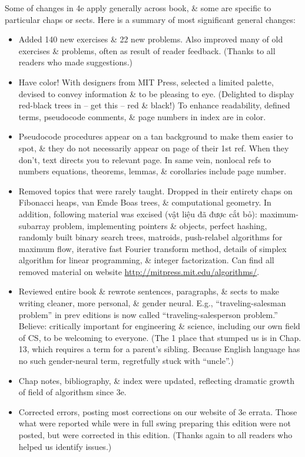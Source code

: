 \documentclass{article}
\begin{document}
\begin{itemize}
\begin{itemize}
		Some of changes in 4e apply generally across book, \& some are specific to particular chaps or sects. Here is a summary of most significant general changes:
		\begin{itemize}
			\item Added 140 new exercises \& 22 new problems. Also improved many of old exercises \& problems, often as result of reader feedback. (Thanks to all readers who made suggestions.)
			\item Have color! With designers from MIT Press, selected a limited palette, devised to convey information \& to be pleasing to eye. (Delighted to display red-black trees in -- get this -- red \& black!) To enhance readability, defined terms, pseudocode comments, \& page numbers in index are in color.
			\item Pseudocode procedures appear on a tan background to make them easier to spot, \& they do not necessarily appear on page of their 1st ref. When they don't, text directs you to relevant page. In same vein, nonlocal refs to numbers equations, theorems, lemmas, \& corollaries include page number.
			\item Removed topics that were rarely taught. Dropped in their entirety chaps on Fibonacci heaps, van Emde Boas trees, \& computational geometry. In addition, following material was excised (vật liệu đã được cắt bỏ): maximum-subarray problem, implementing pointers \& objects, perfect hashing, randomly built binary search trees, matroids, push-relabel algorithms for maximum flow, iterative fast Fourier transform method, details of simplex algorithm for linear programming, \& integer factorization. Can find all removed material on website \url{http://mitpress.mit.edu/algorithms/}.
			\item Reviewed entire book \& rewrote sentences, paragraphs, \& sects to make writing cleaner, more personal, \& gender neural. E.g., ``traveling-salesman problem'' in prev editions is now called ``traveling-salesperson problem.'' Believe: critically important for engineering \& science, including our own field of CS, to be welcoming to everyone. (The 1 place that stumped us is in Chap. 13, which requires a term for a parent's sibling. Because English language has no such gender-neural term, regretfully stuck with ``uncle''.)
			\item Chap notes, bibliography, \& index were updated, reflecting dramatic growth of field of algorithsm since 3e.
			\item Corrected errors, posting most corrections on our website of 3e errata. Those what were reported while were in full swing preparing this edition were not posted, but were corrected in this edition. (Thanks again to all readers who helped us identify issues.)

\end{itemize}
\end{itemize}
\end{itemize}
\end{document}
